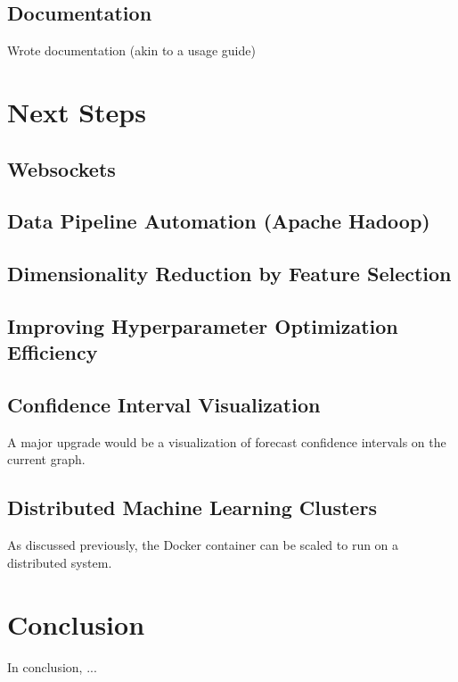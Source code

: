 \documentclass[11pt, oneside]{article}
\begin{document}
\subsection{Documentation}
Wrote documentation (akin to a usage guide)

\section{Next Steps}
\subsection{Websockets}
\subsection{Data Pipeline Automation (Apache Hadoop)}
\subsection{Dimensionality Reduction by Feature Selection}
\subsection{Improving Hyperparameter Optimization Efficiency}
\subsection{Confidence Interval Visualization}
A major upgrade would be a visualization of forecast confidence intervals on the current graph.

\subsection{Distributed Machine Learning Clusters}
As discussed previously, the Docker container can be scaled to run on a distributed system.

\section{Conclusion}
In conclusion, ...
\end{document}
